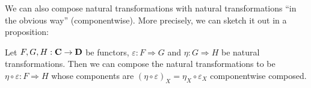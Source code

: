We can also compose natural transformations with natural
transformations ``in the obvious way'' (componentwise). More
precisely, we can sketch it out in a proposition:
\begin{prop}%
Let $F,G,H:\mathbf{C}\to\mathbf{D}$ be functors,
$\varepsilon:F\Rightarrow{}G$ and $\eta:G\Rightarrow{}H$ be
natural transformations. Then we can compose the natural
transformations to be $\eta\circ\varepsilon:F\Rightarrow{}H$
whose components are
$(\eta\circ\varepsilon)_{X}=\eta_{X}\circ\varepsilon_{X}$
componentwise composed.
\end{prop}
